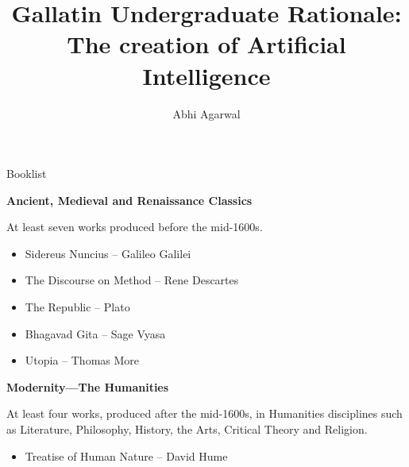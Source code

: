 \documentclass[11pt]{article}
\title{Gallatin Undergraduate Rationale: The creation of Artificial Intelligence}
\author{Abhi Agarwal}
\date{}
\begin{document}
\maketitle









{\large Booklist\par}

\par \textbf{Ancient, Medieval and Renaissance Classics}
\par At least seven works produced before the mid-1600s.
\begin{itemize}
	\item Sidereus Nuncius ­-- Galileo Galilei
	\item The Discourse on Method -- Rene Descartes
	\item The Republic -- Plato
	\item Bhagavad Gita -- Sage Vyasa
	\item Utopia -- Thomas More
\end{itemize}

\par \textbf{Modernity—The Humanities}
\par At least four works, produced after the mid-1600s, in Humanities disciplines such as Literature, Philosophy, History, the Arts, Critical Theory and Religion.
\begin{itemize}
	\item Treatise of Human Nature -- David Hume
\end{itemize}
\end{document}
